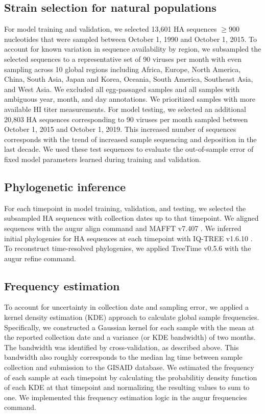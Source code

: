 \subsection*{Strain selection for natural populations}

For model training and validation, we selected 13,601 HA sequences $\geq$900 nucleotides that were sampled between October 1, 1990 and October 1, 2015.
To account for known variation in sequence availability by region, we subsampled the selected sequences to a representative set of 90 viruses per month with even sampling across 10 global regions including Africa, Europe, North America, China, South Asia, Japan and Korea, Oceania, South America, Southeast Asia, and West Asia.
We excluded all egg-passaged samples and all samples with ambiguous year, month, and day annotations.
We prioritized samples with more available HI titer measurements.
For model testing, we selected an additional 20,803 HA sequences corresponding to 90 viruses per month sampled between October 1, 2015 and October 1, 2019.
This increased number of sequences corresponds with the trend of increased sample sequencing and deposition in the last decade.
We used these test sequences to evaluate the out-of-sample error of fixed model parameters learned during training and validation.

\subsection*{Phylogenetic inference}

For each timepoint in model training, validation, and testing, we selected the subsampled HA sequences with collection dates up to that timepoint.
We aligned sequences with the augur align command \cite{Hadfield2018} and MAFFT v7.407 \cite{Katoh2002}.
We inferred initial phylogenies for HA sequences at each timepoint with IQ-TREE v1.6.10 \cite{Nguyen2014}.
To reconstruct time-resolved phylogenies, we applied TreeTime v0.5.6 \cite{Sagulenko2018} with the augur refine command.

\subsection*{Frequency estimation}

To account for uncertainty in collection date and sampling error, we applied a kernel density estimation (KDE) approach to calculate global sample frequencies.
Specifically, we constructed a Gaussian kernel for each sample with the mean at the reported collection date and a variance (or KDE bandwidth) of two months.
The bandwidth was identified by cross-validation, as described above.
This bandwidth also roughly corresponds to the median lag time between sample collection and submission to the GISAID database.
We estimated the frequency of each sample at each timepoint by calculating the probabilitiy density function of each KDE at that timepoint and normalizing the resulting values to sum to one.
We implemented this frequency estimation logic in the augur frequencies command.

